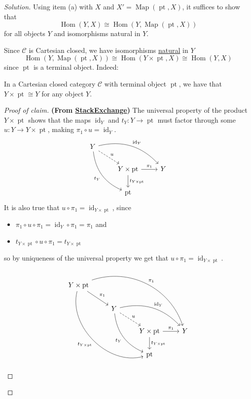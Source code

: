 \documentclass{article}
\numberwithin{equation}{section}
\newcommand{\Cc}{\mathcal{C}}
\DeclareMathOperator{\id}{id}
\DeclareMathOperator{\pt}{pt}
\DeclareMathOperator{\Hom}{Hom}
\DeclareMathOperator{\Map}{Map}
\begin{document}
\begin{proof}[Solution]	
	Using item (a) with $X$ and $X'=\Map(\pt,X)$, it suffices to show that 
	\[\Hom(Y,X)\cong\Hom(Y,\Map(\pt,X))\]
	for all objects $Y$ and isomorphisms natural in $Y$.
	
	Since $\Cc$ is Cartesian closed, we have isomorphisms \href{https://ncatlab.org/nlab/show/internal+hom%20#properties}{natural} in $Y$ \[\Hom(Y,\Map(\pt,X))\cong\Hom(Y\times\pt,X)\cong\Hom(Y,X)\]
	since $\pt$ is a terminal object. Indeed:
	\begin{claim}
		In a Cartesian closed category $\Cc$ with terminal object $\pt$, we have that $Y\times\pt\cong Y$ for any object $Y$.
	\end{claim}
	\begin{proof}[Proof of claim] \textbf{(From \href{https://math.stackexchange.com/questions/542911/proving-basic-lemmas-about-categories-with-finite-products-and-terminal-initial}{StackExchange})} 
		The universal property of the product $Y\times\pt$ shows that the maps $\id_Y$ and $t_Y:Y\to\pt$ must factor through some $u:Y\to Y\times\pt$, making $\pi_1\circ u=\id_Y$.
		\[\begin{tikzcd}
			Y\arrow[rrd,bend left,"\id_Y"]\arrow[ddr,"t_Y",swap,bend right]\arrow[dr,dashed,"u"]\\
			&Y\times\pt\arrow[r,"\pi_1"]\arrow[d,"t_{Y\times\pt}"]&Y\\
			&\pt
		\end{tikzcd}\]
		 It is also true that $u\circ\pi_1=\id_{Y\times\pt}$, since \begin{itemize}
		 	\item $\pi_1\circ u\circ\pi_1=\id_Y\circ\pi_1=\pi_1$ and
		 	\item $t_{Y\times\pt}\circ u\circ\pi_1=t_{Y\times\pt}$
		 \end{itemize}
		 so by uniqueness of the universal property we get that $u\circ\pi_1=\id_{Y\times\pt}$.
		 \[\begin{tikzcd}
		 	Y\times\pt\arrow[dr,"\pi_1"]\arrow[rrrdd,bend left=45,"\pi_1"]\arrow[dddrr,bend right=60,swap,"t_{Y\times\pt}"]\\
		 	&Y\arrow[rrd,bend left,"\id_Y"]\arrow[ddr,"t_Y",swap,bend right]\arrow[dr,dashed,"u"]\\
		 	&&Y\times\pt\arrow[r,"\pi_1"]\arrow[d,"t_{Y\times\pt}"]&Y\\
		 	&&\pt
		 \end{tikzcd}\]
	\end{proof}
\end{proof}
\end{document}

